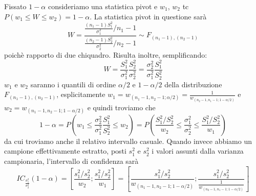  Fissato $1-\alpha$ consideriamo una statistica pivot e $w_1$, $w_2$ tc $P(w_1 \leq W \leq w_2)=1-\alpha$.
 La statistica pivot in questione sarà $$W=\frac{\frac{(n_1-1)S^2_1}{\sigma^2_1} / n_1 - 1}{\frac{(n_2-1)S^2_2}{\sigma^2_2} / n_2 - 1} \sim F_{(n_1 - 1),(n_2 - 1)}$$
poichè rapporto di due chiquadro. Risulta inoltre, semplificando:
 $$W=\frac{S_1^2}{\sigma_1^2}\frac{S_2^2}{\sigma_2^2}=\frac{\sigma_2^2}{\sigma_1^2}\frac{S_1^2}{S_2^2}$$
$w_1$ e $w_2$ saranno i quantili di ordine $\alpha / 2$ e $1 - \alpha / 2$ della distribuzione $F_{(n_1 - 1),(n_2 - 1)}$, 
esplicitamente 
$w_1 = w_{(n_1 - 1,n_2 - 1; \alpha / 2)}=\frac{1}{w_{(n_2 - 1,n_1 - 1; 1 - \alpha / 2)}}$ e 
$w_2 = w_{(n_1 - 1,n_2 - 1; 1 - \alpha / 2)}$ e quindi troviamo che $$1 - \alpha = P(w_1 \leq \frac{\sigma_2^2}{\sigma_1^2}\frac{S_1^2}{S_2^2} \leq w_2)=P\left( \frac{S_1^2 / S_2^2}{w_2} \leq \frac{\sigma_1^2}{\sigma_2^2} \leq \frac{S_1^2 / S_2^2}{w_1} \right)$$
da cui troviamo anche il relativo intervallo casuale.
Quando invece abbiamo un campione effettivamente estratto, posti $s_1^2$ e $s_2^2$ i valori assunti dalla varianza campionaria, l'intervallo di confidenza sarà
$$IC_{\frac{\sigma_1^2}{\sigma_2^2}}(1 - \alpha)=
\left[ \frac{s_1^2 / s_2^2}{w_2} ; \frac{s_1^2 / s_2^2}{w_1} \right]=
\left[ \frac{s_1^2 / s_2^2}{w_{(n_1 - 1,n_2 - 1; 1 - \alpha / 2)}} ; \frac{s_1^2 / s_2^2}{\frac{1}{w_{(n_2 - 1,n_1 - 1; 1 - \alpha / 2)}}} \right]$$ 